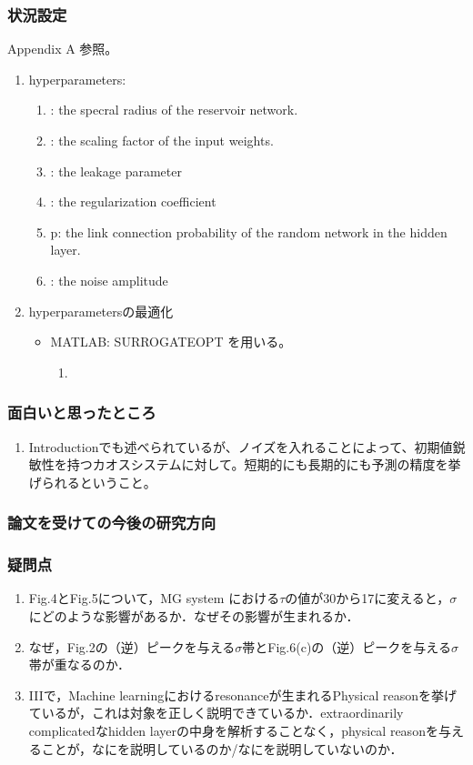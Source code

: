 \subsubsection{状況設定}
Appendix A 参照。
\begin{enumerate}
  \item hyperparameters:\begin{enumerate}
    \item \rho: the specral radius of the  reservoir network.
    \item \gamma: the scaling factor of the input weights.
    \item \alpha: the leakage parameter 
    \item \beta: the regularization coefficient 
    \item p: the link connection probability of the random network in the hidden layer.
    \item \sigma: the noise amplitude 
  \end{enumerate}
  \item hyperparametersの最適化\begin{itemize}
    \item MATLAB: SURROGATEOPT を用いる。\begin{enumerate}
      \item 
    \end{enumerate}
  \end{itemize}
\end{enumerate}
\clearpage

\subsubsection{面白いと思ったところ}
\begin{enumerate}
  \item Introductionでも述べられているが、ノイズを入れることによって、初期値鋭敏性を持つカオスシステムに対して。短期的にも長期的にも予測の精度を挙げられるということ。
\end{enumerate}

\subsubsection{論文を受けての今後の研究方向}
\subsubsection{疑問点}
\begin{enumerate}
  \item Fig.4とFig.5について，MG system における$\tau$の値が30から17に変えると，$\sigma$にどのような影響があるか．なぜその影響が生まれるか．
  \item なぜ，Fig.2の（逆）ピークを与える$\sigma$帯とFig.6(c)の（逆）ピークを与える$\sigma$帯が重なるのか．
  \item IIIで，Machine learningにおけるresonanceが生まれるPhysical reasonを挙げているが，これは対象を正しく説明できているか．extraordinarily complicatedなhidden layerの中身を解析することなく，physical reasonを与えることが，なにを説明しているのか/なにを説明していないのか．
\end{enumerate}

